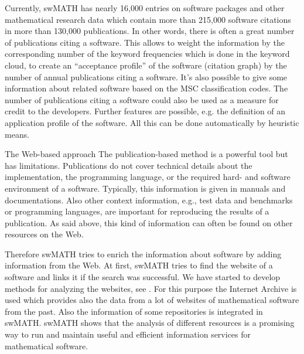 \documentclass[a4paper,11pt]{article}
\begin{document}
\begin{multicols}{2}
\begin{enumerate}
Currently, swMATH has nearly 16,000 entries on software packages and other mathematical research data which contain more than 215,000 software citations in more than 130,000 publications. In other words, there is often a great number of publications citing a software. This allows to weight the information by the corresponding number of the keyword frequencies which is done in the keyword cloud, to create an ``acceptance profile'' of the software (citation graph) by the number of annual publications citing a software.  It's also possible to give some information about  related software based on the MSC classification codes. The number of publications citing a software could also be used as a measure for credit to the developers. Further features are possible, e.g. the definition of an application profile of the software. All this can be done automatically by heuristic means.
\end{enumerate}
\Ueberschriftu
{The Web-based approach}
The publication-based  method is a powerful tool but has limitations. Publications do not cover technical details about the implementation, the programming language, or the required hard- and software environment of a software. Typically, this information is given in manuals and documentations. Also other context information, e.g., test data and benchmarks or programming languages, are important for reproducing the results of a publication. As said above, this kind of information can often  be found on other resources on the Web.

Therefore swMATH tries to enrich the information about software by adding information from the Web. At first, swMATH tries to find the website of a software and links it if the search was successful. We have started to develop methods for analyzing the websites, see \cite{TPDL}. For this purpose the Internet Archive \cite{IA} is used which provides also the data from a lot of websites of mathematical software from the past.
Also the information of some repositories is integrated in swMATH.
swMATH shows that the analysis of different resources is a promising way to run and maintain useful and efficient information services for mathematical software.\par


\end{multicols}
\end{document}
